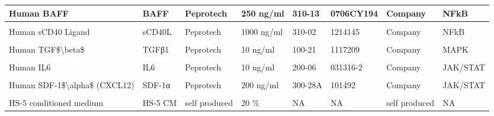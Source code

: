 \documentclass[11pt, a4paper, twosided]{book}
\begin{document}
\begin{table}
{\begin{tabular}[t]{l|l|l|l|l|l|l|l}
\hline
Human BAFF & BAFF & Peprotech & 250 ng/ml & 310-13 & 0706CY194 & Company & NFkB\\
\hline
\cellcolor[HTML]{E2E868}{Human IL-1\$\textbackslash{}beta\$} & \cellcolor[HTML]{E2E868}{IL1β} & \cellcolor[HTML]{E2E868}{Peprotech} & \cellcolor[HTML]{E2E868}{10 ng/ml} & \cellcolor[HTML]{E2E868}{200-01} & \cellcolor[HTML]{E2E868}{0606B95} & \cellcolor[HTML]{E2E868}{Company} & \cellcolor[HTML]{E2E868}{NFkB}\\
\hline
Human sCD40 Ligand & sCD40L & Peprotech & 1000 ng/ml & 310-02 & 1214145 & Company & NFkB\\
\hline
\cellcolor[HTML]{E2E868}{Goat F(AB')2 Fragment to human IgM} & \cellcolor[HTML]{E2E868}{soluble anti-IgM} & \cellcolor[HTML]{E2E868}{MP Biomedicals} & \cellcolor[HTML]{E2E868}{20000 ng/ml} & \cellcolor[HTML]{E2E868}{55055} & \cellcolor[HTML]{E2E868}{7227} & \cellcolor[HTML]{E2E868}{Company} & \cellcolor[HTML]{E2E868}{BCR}\\
\hline
Human TGF\$\textbackslash{}beta\$ & TGFβ1 & Peprotech & 10 ng/ml & 100-21 & 1117209 & Company & MAPK\\
\hline
\cellcolor[HTML]{E2E868}{Human IL15} & \cellcolor[HTML]{E2E868}{IL15} & \cellcolor[HTML]{E2E868}{Peprotech} & \cellcolor[HTML]{E2E868}{10 ng/ml} & \cellcolor[HTML]{E2E868}{200-15} & \cellcolor[HTML]{E2E868}{91624} & \cellcolor[HTML]{E2E868}{Company} & \cellcolor[HTML]{E2E868}{JAK/STAT}\\
\hline
Human IL6 & IL6 & Peprotech & 10 ng/ml & 200-06 & 031316-2 & Company & JAK/STAT\\
\hline
\cellcolor[HTML]{E2E868}{ODN 2006 (ODN 7909)} & \cellcolor[HTML]{E2E868}{CpG ODN} & \cellcolor[HTML]{E2E868}{Invivogen} & \cellcolor[HTML]{E2E868}{1000 ng/ml} & \cellcolor[HTML]{E2E868}{tlrl-2006-1} & \cellcolor[HTML]{E2E868}{3901-09T} & \cellcolor[HTML]{E2E868}{Company} & \cellcolor[HTML]{E2E868}{TLR 9}\\
\hline
Human SDF-1\$\textbackslash{}alpha\$ (CXCL12) & SDF-1α & Peprotech & 200 ng/ml & 300-28A & 101492 & Company & JAK/STAT\\
\hline
\cellcolor[HTML]{E2E868}{Human Interferon \$\textbackslash{}gamma\$} & \cellcolor[HTML]{E2E868}{Interferon γ} & \cellcolor[HTML]{E2E868}{Peprotech} & \cellcolor[HTML]{E2E868}{5 ng/ml} & \cellcolor[HTML]{E2E868}{300-02} & \cellcolor[HTML]{E2E868}{121527} & \cellcolor[HTML]{E2E868}{Company} & \cellcolor[HTML]{E2E868}{NFkB}\\
\hline
HS-5 conditioned medium & HS-5 CM & self produced & 20 \% & NA & NA & self produced & NA\\
\hline
\end{tabular}}
\end{table}
\end{document}
